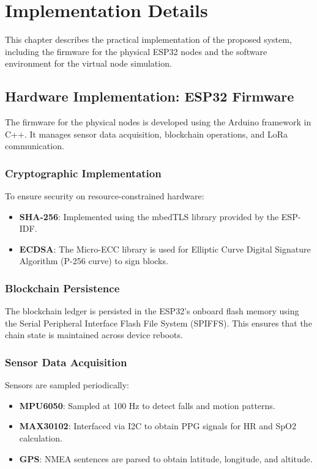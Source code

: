 \chapter{Implementation Details}

This chapter describes the practical implementation of the proposed system, including the firmware for the physical ESP32 nodes and the software environment for the virtual node simulation.

\section{Hardware Implementation: ESP32 Firmware}

The firmware for the physical nodes is developed using the Arduino framework in C++. It manages sensor data acquisition, blockchain operations, and LoRa communication.

\subsection{Cryptographic Implementation}
To ensure security on resource-constrained hardware:
\begin{itemize}
\item \textbf{SHA-256}: Implemented using the mbedTLS library provided by the ESP-IDF.
\item \textbf{ECDSA}: The Micro-ECC library is used for Elliptic Curve Digital Signature Algorithm (P-256 curve) to sign blocks.
\end{itemize}

\subsection{Blockchain Persistence}
The blockchain ledger is persisted in the ESP32's onboard flash memory using the Serial Peripheral Interface Flash File System (SPIFFS). This ensures that the chain state is maintained across device reboots.

\subsection{Sensor Data Acquisition}
Sensors are sampled periodically:
\begin{itemize}
\item \textbf{MPU6050}: Sampled at 100 Hz to detect falls and motion patterns.
\item \textbf{MAX30102}: Interfaced via I2C to obtain PPG signals for HR and SpO2 calculation.
\item \textbf{GPS}: NMEA sentences are parsed to obtain latitude, longitude, and altitude.
\end{itemize}

